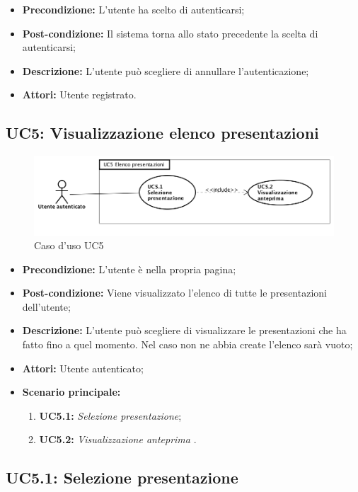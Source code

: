 \begin{itemize}
	\item \textbf{Precondizione:} L'utente ha scelto di autenticarsi;
	\item \textbf{Post-condizione:} Il sistema torna allo stato precedente la scelta di autenticarsi;
	\item \textbf{Descrizione:} L'utente può scegliere di annullare l'autenticazione;
	\item \textbf{Attori:} Utente registrato.
\end{itemize}
\subsection{ UC5: Visualizzazione elenco presentazioni}

\begin{figure}[h]
	\begin{center}
	\includegraphics[scale=0.4]{diagram/UC5.png}
	\caption{Caso d'uso UC5}
	\end{center}
\end{figure}
\begin{itemize}
	\item \textbf{Precondizione:} L'utente è nella propria pagina;
	\item \textbf{Post-condizione:} Viene visualizzato l'elenco di tutte le presentazioni dell'utente;
	\item \textbf{Descrizione:} L'utente può scegliere di visualizzare le presentazioni che ha fatto fino a quel momento. Nel caso non ne abbia create l'elenco sarà vuoto;
	\item \textbf{Attori:} Utente autenticato;
	\item \textbf{Scenario principale:}
	\begin{enumerate}
		\item \textbf{ UC5.1:} \textit{ Selezione presentazione};
		\item \textbf{ UC5.2:} \textit{ Visualizzazione anteprima }.
	\end{enumerate}
\end{itemize}

\newpage
\subsection{ UC5.1: Selezione presentazione}


